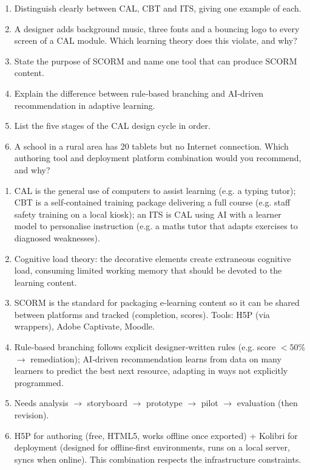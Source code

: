 \documentclass[11pt]{article}
\begin{document}
\begin{exercice}
\begin{enumerate}
\item Distinguish clearly between CAL, CBT and ITS, giving one example of each.
\item A designer adds background music, three fonts and a bouncing logo to every screen of a CAL module. Which learning theory does this violate, and why?
\item State the purpose of SCORM and name one tool that can produce SCORM content.
\item Explain the difference between rule‑based branching and AI‑driven recommendation in adaptive learning.
\item List the five stages of the CAL design cycle in order.
\item A school in a rural area has 20 tablets but no Internet connection. Which authoring tool and deployment platform combination would you recommend, and why?
\end{enumerate}
\end{exercice}

\begin{corrige}[Exercise 1]
\begin{enumerate}
\item CAL is the general use of computers to assist learning (e.g. a typing tutor); CBT is a self‑contained training package delivering a full course (e.g. staff safety training on a local kiosk); an ITS is CAL using AI with a learner model to personalise instruction (e.g. a maths tutor that adapts exercises to diagnosed weaknesses).
\item Cognitive load theory: the decorative elements create extraneous cognitive load, consuming limited working memory that should be devoted to the learning content.
\item SCORM is the standard for packaging e‑learning content so it can be shared between platforms and tracked (completion, scores). Tools: H5P (via wrappers), Adobe Captivate, Moodle.
\item Rule‑based branching follows explicit designer‑written rules (e.g. score $< 50\%$ $\rightarrow$ remediation); AI‑driven recommendation learns from data on many learners to predict the best next resource, adapting in ways not explicitly programmed.
\item Needs analysis $\rightarrow$ storyboard $\rightarrow$ prototype $\rightarrow$ pilot $\rightarrow$ evaluation (then revision).
\item H5P for authoring (free, HTML5, works offline once exported) + Kolibri for deployment (designed for offline‑first environments, runs on a local server, syncs when online). This combination respects the infrastructure constraints.
\end{enumerate}
\end{corrige}
\end{document}
